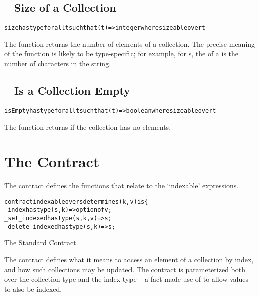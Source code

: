 \subsection{ -- Size of a  Collection}
\label{sizeFunction}
\begin{alltt}
size has type for all t such that (t)=>integer where sizeable over t
\end{alltt}

The  function returns the number of elements of a  collection. The precise meaning of the  function is likely to be type-specific; for example, for s, the  of a  is the number of characters in the string.

\subsection{ -- Is a  Collection Empty}
\label{isEmptyFunction}
\begin{alltt}
isEmpty has type for all t such that (t)=>boolean where sizeable over t
\end{alltt}
The  function returns  if the collection has no elements.

\section{The  Contract}
\label{indexableContract}
The  contract defines the functions that relate to the `indexable' expressions.

\begin{program}
\begin{alltt}
contract indexable over s determines (k,v) is \{
  _index has type (s,k)=>option of v;
  _set_indexed has type (s,k,v)=>s;
  _delete_indexed has type (s,k)=>s;
\end{alltt}
\caption{The Standard  Contract}\label{indexableContractDef}
\end{program}

The  contract defines what it means to access an element of a collection by index, and how such collections may be updated. The contract is parameterized both over the collection type and the index type -- a fact made use of to allow  values to also be indexed.

